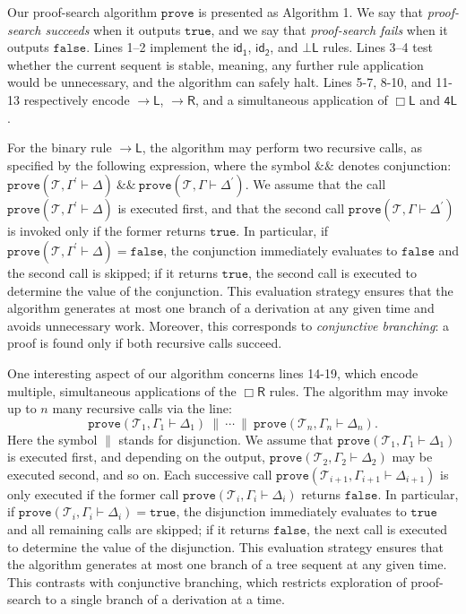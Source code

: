 \documentclass[copyright,creativecommons]{eptcs}
\newcommand{\tel}{\mathcal{T}}
\newcommand{\idi}{\mathsf{id_{1}}}
\newcommand{\idii}{\mathsf{id_{2}}}
\newcommand{\boxl}{\Box\mathsf{L}}
\newcommand{\boxr}{\Box\mathsf{R}}
\newcommand{\fourru}{\mathsf{4L}}
\newcommand{\calc}{\mathsf{CSGL}}
\newcommand{\sar}{\vdash}
\newcommand{\true}{\mathtt{true}}
\newcommand{\false}{\mathtt{false}}
\newcommand{\prove}{\mathtt{prove}}
\newcommand{\impl}{{\rightarrow}\mathsf{L}}
\newcommand{\impr}{{\rightarrow}\mathsf{R}}
\newcommand{\botl}{\bot\mathsf{L}}
\begin{document}
Our proof-search algorithm $\prove$ is presented as Algorithm 1. %
We say that \emph{proof-search succeeds} when it outputs $\true$, and we say that \emph{proof-search fails} when it outputs $\false$. Lines 1–2 implement the $\idi$, $\idii$, and $\botl$ rules. Lines 3–4 test whether the current sequent is stable, meaning, any further rule application would be unnecessary, and the algorithm can safely halt. Lines 5-7, 8-10, and 11-13 respectively encode $\impl$, $\impr$, and a simultaneous application of $\boxl$ and $\fourru$. 

For the binary rule $\impl$, the algorithm may perform two recursive calls, as specified by the following expression, where the symbol $\&\&$ denotes conjunction: $\prove(\tel,\Gamma^\prime \sar \Delta) \ \&\& \ \prove(\tel,\Gamma\sar \Delta^\prime )$. We assume that the call $\prove(\tel,\Gamma^\prime \sar \Delta)$ is executed first, and that the second call $\prove(\tel,\Gamma \sar \Delta^\prime)$ is invoked only if the former returns $\true$. In particular, if $\prove(\tel,\Gamma^\prime \sar \Delta)=\false$, the conjunction immediately evaluates to $\false$ and the second call is skipped; if it returns $\true$, the second call is executed to determine the value of the conjunction. This evaluation strategy ensures that the algorithm generates at most one branch of a derivation at any given time and avoids unnecessary work. Moreover, this corresponds to \emph{conjunctive branching}: %
a proof is found only if both recursive calls succeed. 

One interesting aspect of our algorithm concerns lines 14-19, which encode multiple, simultaneous applications of the $\boxr$ rules. The algorithm may invoke up to $n$ many recursive calls via the line:
$$
\prove(\tel_{1},\Gamma_{1} \sar \Delta_{1}) \ \| \ \cdots \ \| \ \prove(\tel_{n}, \Gamma_{n} \sar \Delta_{n}).
$$
Here the symbol $\|$ stands for disjunction. We assume that $\prove(\tel_{1},\Gamma_{1} \sar \Delta_{1})$ is executed first, and depending on the output, $\prove(\tel_{2},\Gamma_{2} \sar \Delta_{2})$ may be executed second, and so on. Each successive call $\prove(\tel_{i+1},\Gamma_{i+1} \sar \Delta_{i+1})$ is only executed if the former call $\prove(\tel_{i},\Gamma_{i} \sar \Delta_{i})$ returns $\false$. In particular, if $\prove(\tel_{i}, \Gamma_{i} \sar \Delta_{i})=\true$, the disjunction immediately evaluates to $\true$ and all remaining calls are skipped; if it returns $\false$, the next call is executed to determine the value of the disjunction. This evaluation strategy ensures that the algorithm generates at most one branch of a tree sequent at any given time. This contrasts with conjunctive branching, which restricts exploration of proof-search to a single branch of a derivation at a time.
\end{document}
